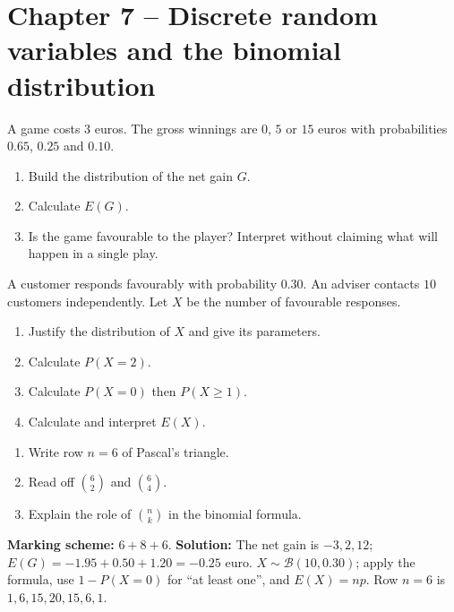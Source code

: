\section*{Chapter 7 -- Discrete random variables and the binomial distribution}
\begin{exercise}
A game costs $3$ euros. The gross winnings are $0$, $5$ or $15$ euros with probabilities $\num{0,65}$, $\num{0,25}$ and $\num{0,10}$.
\begin{enumerate}
\item Build the distribution of the net gain $G$.
\item Calculate $E(G)$.
\item Is the game favourable to the player? Interpret without claiming what will happen in a single play.
\end{enumerate}
\end{exercise}
\begin{exercise}
A customer responds favourably with probability $\num{0,30}$. An adviser contacts $10$ customers independently. Let $X$ be the number of favourable responses.
\begin{enumerate}
\item Justify the distribution of $X$ and give its parameters.
\item Calculate $P(X=2)$.
\item Calculate $P(X=0)$ then $P(X\geq1)$.
\item Calculate and interpret $E(X)$.
\end{enumerate}
\end{exercise}
\begin{exercise}
\begin{enumerate}
\item Write row $n=6$ of Pascal's triangle.
\item Read off $\binom62$ and $\binom64$.
\item Explain the role of $\binom nk$ in the binomial formula.
\end{enumerate}
\end{exercise}
\begin{solution}\textbf{Marking scheme:} $6+8+6$. \textbf{Solution:} The net gain is $-3,2,12$; $E(G)=-\num{1,95}+\num{0,50}+\num{1,20}=-\num{0,25}$ euro. $X\sim\mathcal B(10,\num{0,30})$; apply the formula, use $1-P(X=0)$ for ``at least one'', and $E(X)=np$. Row $n=6$ is $1,6,15,20,15,6,1$.\end{solution}


